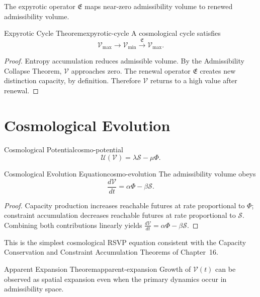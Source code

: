 \documentclass[12pt,twoside,openright]{book}
\begin{document}
The expyrotic operator $\mathfrak{E}$ maps near-zero
admissibility volume to renewed admissibility volume.

\begin{theorem}{Expyrotic Cycle Theorem}{expyrotic-cycle}
  A cosmological cycle satisfies
  \[
    \mathcal{V}_{\max} \to \mathcal{V}_{\min}
    \xrightarrow{\ \mathfrak{E}\ } \mathcal{V}_{\max}.
  \]
\end{theorem}

\begin{proof}
  Entropy accumulation reduces admissible volume. By the
  Admissibility Collapse Theorem, $\mathcal{V}$ approaches
  zero. The renewal operator $\mathfrak{E}$ creates new
  distinction capacity, by definition. Therefore
  $\mathcal{V}$ returns to a high value after renewal.
\end{proof}

\section{Cosmological Evolution}
\label{sec:ch18-evolution}

\begin{definition}{Cosmological Potential}{cosmo-potential}
  \[
    \mathcal{U}(\mathcal{V}) = \lambda \mathcal{S} - \mu \Phi.
  \]
\end{definition}

\begin{theorem}{Cosmological Evolution Equation}{cosmo-evolution}
  The admissibility volume obeys
  \[
    \frac{d\mathcal{V}}{dt} = \alpha \Phi - \beta \mathcal{S}.
  \]
\end{theorem}

\begin{proof}
  Capacity production increases reachable futures at rate
  proportional to $\Phi$; constraint accumulation decreases
  reachable futures at rate proportional to $\mathcal{S}$.
  Combining both contributions linearly yields
  $\frac{d\mathcal{V}}{dt} = \alpha\Phi - \beta\mathcal{S}$.
\end{proof}

This is the simplest cosmological RSVP equation consistent
with the Capacity Conservation and Constraint Accumulation
Theorems of Chapter~16.

\begin{theorem}{Apparent Expansion Theorem}{apparent-expansion}
  Growth of $\mathcal{V}(t)$ can be observed as spatial
  expansion even when the primary dynamics occur in
  admissibility space.
\end{theorem}
\end{document}
